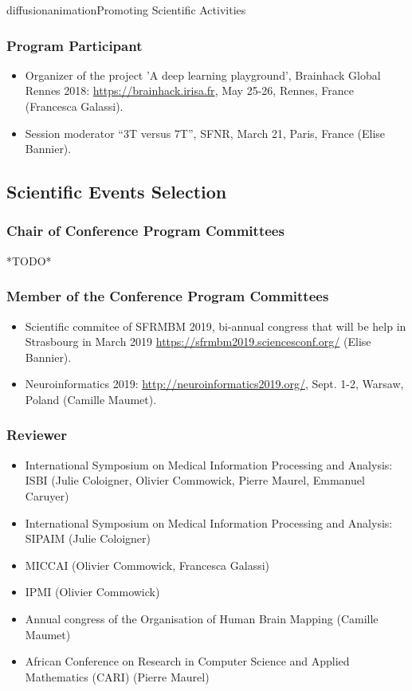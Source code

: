 \documentclass{ra2018}
\begin{document}
\begin{module}{diffusion}{animation}{Promoting Scientific Activities}
    \subsubsection{Program Participant}
    \begin{itemize}
        \item Organizer of the project 'A deep learning playground', Brainhack Global Rennes 2018: \url{https://brainhack.irisa.fr}, May 25-26, Rennes, France (Francesca Galassi).
        \item Session moderator ``3T versus 7T'', SFNR, March 21, Paris, France (Elise Bannier).
    \end{itemize}  
\subsection {Scientific Events Selection}
    \subsubsection{Chair of Conference Program Committees}
    *TODO*
    \subsubsection{Member of the Conference Program Committees}
    \begin{itemize}
        \item Scientific commitee of SFRMBM 2019, bi-annual congress that will be help in Strasbourg in March 2019 \url{https://sfrmbm2019.sciencesconf.org/} (Elise Bannier).
        \item Neuroinformatics 2019: \url{http://neuroinformatics2019.org/}, Sept. 1-2, Warsaw, Poland (Camille Maumet).
    \end{itemize}
    \subsubsection{Reviewer}
    \begin{itemize}
        \item International Symposium on Medical Information Processing and Analysis: ISBI (Julie Coloigner, Olivier Commowick, Pierre Maurel, Emmanuel Caruyer)
	\item International Symposium on Medical Information Processing and Analysis: SIPAIM (Julie Coloigner)
        \item MICCAI (Olivier Commowick, Francesca Galassi)
        \item IPMI (Olivier Commowick)
        \item Annual congress of the Organisation of Human Brain Mapping (Camille Maumet)
        \item African Conference on Research in Computer Science and Applied Mathematics (CARI) (Pierre Maurel)
    \end{itemize}   

\end{module}
\end{document}
